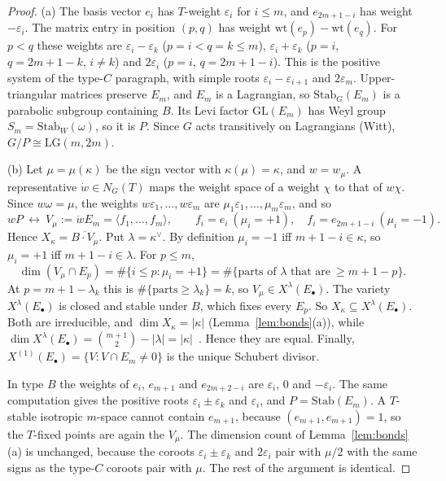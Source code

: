 \documentclass[11pt]{amsart}
\theoremstyle{definition}
\theoremstyle{remark}
\newcommand{\LG}{\mathrm{LG}}
\begin{document}
\begin{proof}
(a) The basis vector $e_i$ has $T$-weight $\varepsilon_i$ for $i\le m$, and $e_{2m+1-i}$ has
weight $-\varepsilon_i$. The matrix entry in position $(p,q)$ has weight
$\mathrm{wt}(e_p)-\mathrm{wt}(e_q)$. For $p<q$ these weights are $\varepsilon_i-\varepsilon_k$
($p=i<q=k\le m$), $\varepsilon_i+\varepsilon_k$ ($p=i$, $q=2m+1-k$, $i\neq k$) and $2\varepsilon_i$
($p=i$, $q=2m+1-i$). This is the positive system of the type-$C$ paragraph, with simple roots
$\varepsilon_i-\varepsilon_{i+1}$ and $2\varepsilon_m$. Upper-triangular matrices preserve
$E_m$, and $E_m$ is a Lagrangian, so $\mathrm{Stab}_G(E_m)$ is a parabolic subgroup containing
$B$. Its Levi factor $\mathrm{GL}(E_m)$ has Weyl group $S_m=\mathrm{Stab}_W(\omega)$, so it
is $P$. Since $G$ acts transitively on Lagrangians (Witt), $G/P\cong\LG(m,2m)$.

(b) Let $\mu=\mu(\kappa)$ be the sign vector with $\kappa(\mu)=\kappa$, and $w=w_\mu$. A
representative $\dot w\in N_G(T)$ maps the weight space of a weight $\chi$ to that of
$w\chi$. Since $w\omega=\mu$, the weights $w\varepsilon_1,\dots,w\varepsilon_m$ are
$\mu_1\varepsilon_1,\dots,\mu_m\varepsilon_m$, and so
\[ wP\ \longleftrightarrow\ V_\mu:=\dot wE_m=\langle f_1,\dots,f_m\rangle,\qquad
f_i=e_i\ (\mu_i=+1),\quad f_i=e_{2m+1-i}\ (\mu_i=-1). \]
Hence $X_\kappa=\overline{B\cdot V_\mu}$. Put $\lambda=\kappa^\vee$. By definition
$\mu_i=-1$ iff $m+1-i\in\kappa$, so $\mu_i=+1$ iff $m+1-i\in\lambda$. For $p\le m$,
\[ \dim(V_\mu\cap E_p)=\#\{i\le p:\mu_i=+1\}=\#\{\text{parts of }\lambda\text{ that are}\ \ge
m+1-p\}. \]
At $p=m+1-\lambda_k$ this is $\#\{\text{parts}\ge\lambda_k\}=k$, so $V_\mu\in
X^\lambda(E_\bullet)$. The variety $X^\lambda(E_\bullet)$ is closed and stable under $B$, which
fixes every $E_p$. So $X_\kappa\subseteq X^\lambda(E_\bullet)$. Both are irreducible, and
$\dim X_\kappa=|\kappa|$ (Lemma~\ref{lem:bonds}(a)), while $\dim X^\lambda(E_\bullet)=
\binom{m+1}2-|\lambda|=|\kappa|$~\cite[\S\S4--5]{BR12}. Hence they are equal. Finally,
$X^{(1)}(E_\bullet)=\{V:V\cap E_m\ne0\}$ is the unique Schubert divisor.

In type $B$ the weights of $e_i$, $e_{m+1}$ and $e_{2m+2-i}$ are $\varepsilon_i$, $0$ and
$-\varepsilon_i$. The same computation gives the positive roots $\varepsilon_i\pm\varepsilon_k$
and $\varepsilon_i$, and $P=\mathrm{Stab}(E_m)$. A $T$-stable isotropic $m$-space cannot
contain $e_{m+1}$, because $(e_{m+1},e_{m+1})=1$, so the $T$-fixed points are again the
$V_\mu$. The dimension count of Lemma~\ref{lem:bonds}(a) is unchanged, because the coroots
$\varepsilon_i\pm\varepsilon_k$ and $2\varepsilon_i$ pair with $\mu/2$ with the same signs as the
type-$C$ coroots pair with $\mu$. The rest of the argument is identical.
\end{proof}
\end{document}
